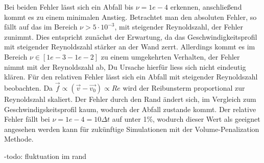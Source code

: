 Bei beiden Fehler lässt sich ein Abfall bis $\nu=1e-4$ erkennen, anschließend kommt es zu einem minimalen Anstieg.
Betrachtet man den absoluten Fehler, so fällt auf das im Bereich $\nu>5\cdot10^{-3}$, mit steigender Reynoldszahl, der Fehler zunimmt.
Dies entspricht zunächst der Erwartung, da das Geschwindigkeitsprofil mit steigender Reynoldszahl stärker an der Wand zerrt.
Allerdings kommt es im Bereich $\nu \in [1e-3 - 1e-2]$ zu einem umgekehrten Verhalten, der Fehler nimmt mit der Reynoldszahl ab,
Du Ursache hierfür liess sich nicht eindeutig klären.
Für den relativen Fehler lässt sich ein Abfall mit steigender Reynoldszahl beobachten. Da $\vec{f} \propto (\vec{v}-\vec{v_0})  \propto Re$ wird der Reibunsterm
proportional zur Reynoldszahl skaliert. Der Fehler durch den Rand ändert sich, im Vergleich zum Geschwindigskeitsprofil kaum, wodurch der Abfall zustande kommt.
Der relative Fehler fällt bei $\nu=1e-4=10\Delta t$ auf unter 1\%, wodurch dieser Wert als geeignet angesehen werden kann für zukünftige Simulationen mit der Volume-Penalization Methode.

-todo: fluktuation im rand


